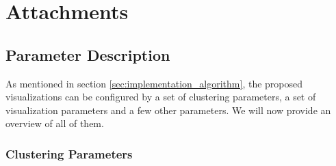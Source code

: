 \chapter{Attachments}

\section{Parameter Description}
\label{sec:parameter_description}

As mentioned in section \ref{sec:implementation_algorithm}, the proposed visualizations can be configured by a set of clustering parameters, a set of visualization parameters and a few other parameters. We will now provide an overview of all of them.

\subsection{Clustering Parameters}
\label{sec:clustering_parameters}

